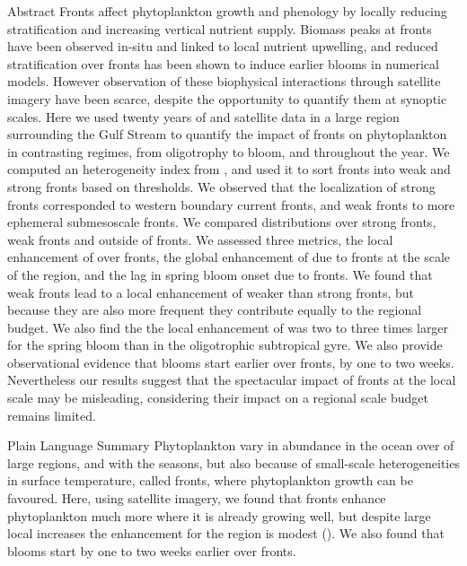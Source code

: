 \begin{articleBlock}{Abstract}
  Fronts affect phytoplankton growth and phenology by locally reducing stratification and increasing vertical nutrient supply.
  Biomass peaks at fronts have been observed in-situ and linked to local nutrient upwelling, and reduced stratification over fronts has been shown to induce earlier blooms in numerical models.
  However observation of these biophysical interactions through satellite imagery have been scarce, despite the opportunity to quantify them at synoptic scales.
  Here we used twenty years of  and  satellite data in a large region surrounding the Gulf Stream to quantify the impact of fronts on phytoplankton in contrasting regimes, from oligotrophy to bloom, and throughout the year.
  We computed an heterogeneity index  from , and used it to sort fronts into weak and strong fronts based on  thresholds.
  We observed that the localization of strong fronts corresponded to western boundary current fronts, and weak fronts to more ephemeral submesoscale fronts.
  We compared  distributions over strong fronts, weak fronts and outside of fronts.
  We assessed three metrics, the local enhancement of  over fronts, the global enhancement of  due to fronts at the scale of the region, and the lag in spring bloom onset due to fronts.
  We found that weak fronts lead to a local enhancement of  weaker than strong fronts, but because they are also more frequent they contribute equally to the regional  budget.
  We also find the the local enhancement of  was two to three times larger for the spring bloom than in the oligotrophic subtropical gyre.
  We also provide observational evidence that blooms start earlier over fronts, by one to two weeks.
  Nevertheless our results suggest that the spectacular impact of fronts at the local scale may be misleading, considering their impact on a regional scale budget remains limited.
\end{articleBlock}


\begin{articleBlock}{Plain Language Summary}
  Phytoplankton vary in abundance in the ocean over of large regions, and with the seasons, but also because of small-scale heterogeneities in surface temperature, called fronts, where phytoplankton growth can be favoured.
  Here, using satellite imagery, we found that fronts enhance phytoplankton much more where it is already growing well, but despite large local increases the  enhancement for the region is modest (). We also found that blooms start by one to two weeks earlier over fronts.
\end{articleBlock}


